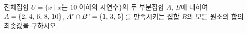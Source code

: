 전체집합 $U=\{x \mid x$는 $10$ 이하의 자연수$\}$의 두 부분집합 $A$, $B$에 대하여 $A=\{2,\mkern3mu 4,\mkern3mu 6,\mkern3mu 8,\mkern3mu 10\}$, ${A}^{\mathrm{c}}\cap{B}^{\mathrm{c}}=\{1,\mkern3mu 3,\mkern3mu 5\}$를 만족시키는 집합 $B$의 모든 원소의 합의 최솟값을 구하시오.

